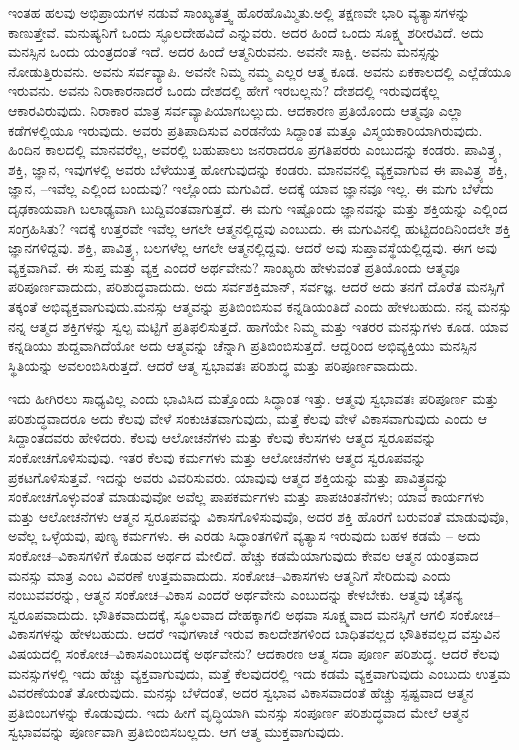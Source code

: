 \vskip 2pt

ಇಂತಹ ಹಲವು ಅಭಿಪ್ರಾಯಗಳ ನಡುವೆ ಸಾಂಖ್ಯತತ್ತ್ವ ಹೊರಹೊಮ್ಮಿತು.\break ಅಲ್ಲಿ ತಕ್ಷಣವೇ ಭಾರಿ ವ್ಯತ್ಯಾಸಗಳನ್ನು ಕಾಣುತ್ತೇವೆ. ಮನುಷ್ಯನಿಗೆ ಒಂದು ಸ್ಫೂಲದೇಹವಿದೆ ಎನ್ನುವರು. ಅದರ ಹಿಂದೆ ಒಂದು ಸೂಕ್ಷ್ಮ ಶರೀರವಿದೆ. ಅದು ಮನಸ್ಸಿನ ಒಂದು ಯಂತ್ರದಂತೆ ಇದೆ. ಅದರ ಹಿಂದೆ ಆತ್ಮನಿರುವನು. ಅವನೇ ಸಾಕ್ಷಿ. ಅವನು ಮನಸ್ಸನ್ನು ನೋಡುತ್ತಿರುವನು. ಅವನು ಸರ್ವವ್ಯಾಪಿ. ಅವನೇ ನಿಮ್ಮ ನಮ್ಮ ಎಲ್ಲರ ಆತ್ಮ ಕೂಡ. ಅವನು ಏಕಕಾಲದಲ್ಲಿ ಎಲ್ಲೆಡೆಯೂ ಇರುವನು. ಅವನು ನಿರಾಕಾರನಾದರೆ ಒಂದು ದೇಶದಲ್ಲಿ ಹೇಗೆ ಇರಬಲ್ಲನು? ದೇಶದಲ್ಲಿ ಇರುವುದಕ್ಕೆಲ್ಲ ಆಕಾರವಿರುವುದು. ನಿರಾಕಾರ ಮಾತ್ರ ಸರ್ವವ್ಯಾಪಿಯಾಗಬಲ್ಲುದು. ಆದಕಾರಣ ಪ್ರತಿಯೊಂದು ಆತ್ಮವೂ ಎಲ್ಲಾ ಕಡೆಗಳಲ್ಲಿಯೂ ಇರುವುದು. ಅವರು ಪ್ರತಿಪಾದಿಸುವ ಎರಡನೆಯ ಸಿದ್ದಾಂತ ಮತ್ತೂ ವಿಸ್ಮಯಕಾರಿಯಾಗಿರುವುದು. ಹಿಂದಿನ ಕಾಲದಲ್ಲಿ ಮಾನವರೆಲ್ಲ, ಅವರಲ್ಲಿ ಬಹುಪಾಲು ಜನರಾದರೂ ಪ್ರಗತಿಪರರು ಎಂಬುದನ್ನು ಕಂಡರು. ಪಾವಿತ್ರ್ಯ, ಶಕ್ತಿ, ಜ್ಞಾನ, ಇವುಗಳಲ್ಲಿ ಅವರು ಬೆಳೆಯುತ್ತ ಹೋಗುವುದನ್ನು ಕಂಡರು. ಮಾನವನಲ್ಲಿ ವ್ಯಕ್ತವಾಗುವ ಈ ಪಾವಿತ್ರ್ಯ ಶಕ್ತಿ, ಜ್ಞಾನ, –ಇವೆಲ್ಲ ಎಲ್ಲಿಂದ ಬಂದುವು? ಇಲ್ಲೊಂದು ಮಗುವಿದೆ. ಅದಕ್ಕೆ ಯಾವ ಜ್ಞಾನವೂ ಇಲ್ಲ. ಈ ಮಗು ಬೆಳೆದು ದೃಢಕಾಯವಾಗಿ ಬಲಾಢ್ಯವಾಗಿ ಬುದ್ದಿವಂತವಾಗುತ್ತದೆ. ಈ ಮಗು ಇಷ್ಟೊಂದು ಜ್ಞಾನವನ್ನು ಮತ್ತು ಶಕ್ತಿಯನ್ನು ಎಲ್ಲಿಂದ ಸಂಗ್ರಹಿಸಿತು? ಇದಕ್ಕೆ ಉತ್ತರವೇ ಇವೆಲ್ಲ ಆಗಲೇ ಆತ್ಮನಲ್ಲಿದ್ದವು ಎಂಬುದು. ಈ ಮಗುವಿನಲ್ಲಿ ಹುಟ್ಟಿದಂದಿನಿಂದಲೇ ಶಕ್ತಿ ಜ್ಞಾನಗಳಿದ್ದವು. ಶಕ್ತಿ, ಪಾವಿತ್ರ್ಯ, ಬಲಗಳೆಲ್ಲ ಆಗಲೇ ಆತ್ಮನಲ್ಲಿದ್ದವು. ಆದರೆ ಅವು ಸುಪ್ತಾವಸ್ಥೆಯಲ್ಲಿದ್ದವು. ಈಗ ಅವು ವ್ಯಕ್ತವಾಗಿವೆ. ಈ ಸುಪ್ತ ಮತ್ತು ವ್ಯಕ್ತ ಎಂದರೆ ಅರ್ಥವೇನು? ಸಾಂಖ್ಯರು ಹೇಳುವಂತೆ ಪ್ರತಿಯೊಂದು ಆತ್ಮವೂ ಪರಿಪೂರ್ಣವಾದುದು, ಪರಿಶುದ್ಧವಾದುದು. ಅದು ಸರ್ವಶಕ್ತಿಮಾನ್, ಸರ್ವಜ್ಞ. ಆದರೆ ಅದು ತನಗೆ ದೊರೆತ ಮನಸ್ಸಿಗೆ ತಕ್ಕಂತೆ ಅಭಿವ್ಯಕ್ತವಾಗುವುದು.\break ಮನಸ್ಸು ಆತ್ಮವನ್ನು ಪ್ರತಿಬಿಂಬಿಸುವ ಕನ್ನಡಿಯಂತಿದೆ ಎಂದು ಹೇಳಬಹುದು. ನನ್ನ ಮನಸ್ಸು ನನ್ನ ಆತ್ಮದ ಶಕ್ತಿಗಳನ್ನು ಸ್ವಲ್ಪ ಮಟ್ಟಿಗೆ ಪ್ರತಿಫಲಿಸುತ್ತದೆ. ಹಾಗೆಯೇ ನಿಮ್ಮ ಮತ್ತು ಇತರರ ಮನಸ್ಸುಗಳು ಕೂಡ. ಯಾವ ಕನ್ನಡಿಯು ಶುದ್ದವಾಗಿದೆಯೋ ಅದು ಆತ್ಮವನ್ನು ಚೆನ್ನಾಗಿ ಪ್ರತಿಬಿಂಬಿಸುತ್ತದೆ. ಆದ್ದರಿಂದ ಅಭಿವ್ಯಕ್ತಿಯು ಮನಸ್ಸಿನ ಸ್ಥಿತಿಯನ್ನು ಅವಲಂಬಿಸಿರುತ್ತದೆ. ಆದರೆ ಆತ್ಮ ಸ್ವಭಾವತಃ ಪರಿಶುದ್ಧ ಮತ್ತು ಪರಿಪೂರ್ಣವಾದುದು.

ಇದು ಹೀಗಿರಲು ಸಾಧ್ಯವಿಲ್ಲ ಎಂದು ಭಾವಿಸಿದ ಮತ್ತೊಂದು ಸಿದ್ಧಾಂತ ಇತ್ತು. ಆತ್ಮವು ಸ್ವಭಾವತಃ ಪರಿಪೂರ್ಣ ಮತ್ತು ಪರಿಶುದ್ಧವಾದರೂ ಅದು ಕೆಲವು ವೇಳೆ ಸಂಕುಚಿತವಾಗುವುದು, ಮತ್ತೆ ಕೆಲವು ವೇಳೆ ವಿಕಾಸವಾಗುವುದು ಎಂದು ಆ ಸಿದ್ದಾಂತದವರು ಹೇಳಿದರು. ಕೆಲವು ಆಲೋಚನೆಗಳು ಮತ್ತು ಕೆಲವು ಕೆಲಸಗಳು ಆತ್ಮದ ಸ್ವರೂಪವನ್ನು ಸಂಕೋಚಗೊಳಿಸುವುವು. ಇತರ ಕೆಲವು ಕರ್ಮಗಳು ಮತ್ತು ಆಲೋಚನೆಗಳು ಆತ್ಮದ ಸ್ವರೂಪವನ್ನು ಪ್ರಕಟಗೊಳಿಸುತ್ತವೆ. ಇದನ್ನು ಅವರು ವಿವರಿಸುವರು. ಯಾವುವು ಆತ್ಮದ ಶಕ್ತಿಯನ್ನು ಮತ್ತು ಪಾವಿತ್ರ್ಯವನ್ನು ಸಂಕೋಚಗೊಳ್ಳುವಂತೆ ಮಾಡುವುವೋ ಅವೆಲ್ಲ ಪಾಪಕರ್ಮಗಳು ಮತ್ತು ಪಾಪಚಿಂತನೆಗಳು; ಯಾವ ಕಾರ್ಯಗಳು ಮತ್ತು ಆಲೋಚನೆಗಳು ಆತ್ಮನ ಸ್ವರೂಪವನ್ನು ವಿಕಾಸಗೊಳಿಸುವುವೊ, ಅದರ ಶಕ್ತಿ ಹೊರಗೆ ಬರುವಂತೆ ಮಾಡುವುವೊ, ಅವೆಲ್ಲ ಒಳ್ಳೆಯವು, ಪುಣ್ಯ ಕರ್ಮಗಳು. ಈ ಎರಡು ಸಿದ್ಧಾಂತಗಳಿಗೆ ವ್ಯತ್ಯಾಸ ಇರುವುದು ಬಹಳ ಕಡಮೆ – ಅದು ಸಂಕೋಚ–ವಿಕಾಸಗಳಿಗೆ ಕೊಡುವ ಅರ್ಥದ ಮೇಲಿದೆ. ಹೆಚ್ಚು ಕಡಮೆಯಾಗುವುದು ಕೇವಲ ಆತ್ಮನ ಯಂತ್ರವಾದ ಮನಸ್ಸು ಮಾತ್ರ ಎಂಬ ವಿವರಣೆ ಉತ್ತಮವಾದುದು. ಸಂಕೋಚ–ವಿಕಾಸಗಳು ಆತ್ಮನಿಗೆ ಸೇರಿದುವು ಎಂದು ನಂಬುವವರನ್ನು, ಆತ್ಮನ ಸಂಕೋಚ–ವಿಕಾಸ ಎಂದರೆ ಅರ್ಥವೇನು ಎಂಬುದನ್ನು ಕೇಳಬೇಕು. ಆತ್ಮವು ಚೈತನ್ಯ ಸ್ವರೂಪವಾದುದು. ಭೌತಿಕವಾದುದಕ್ಕೆ, ಸ್ಥೂಲವಾದ ದೇಹಕ್ಕಾಗಲಿ ಅಥವಾ ಸೂಕ್ಷ್ಮವಾದ ಮನಸ್ಸಿಗೆ ಆಗಲಿ ಸಂಕೋಚ–ವಿಕಾಸಗಳನ್ನು ಹೇಳಬಹುದು. ಆದರೆ ಇವುಗಳಾಚೆ ಇರುವ ಕಾಲದೇಶಗಳಿಂದ ಬಾಧಿತವಲ್ಲದ ಭೌತಿಕವಲ್ಲದ ವಸ್ತುವಿನ ವಿಷಯದಲ್ಲಿ ಸಂಕೋಚ–ವಿಕಾಸ\break ಎಂಬುದಕ್ಕೆ ಅರ್ಥವೇನು? ಆದಕಾರಣ ಆತ್ಮ ಸದಾ ಪೂರ್ಣ ಪರಿಶುದ್ಧ. ಆದರೆ ಕೆಲವು ಮನಸ್ಸುಗಳಲ್ಲಿ ಇದು ಹೆಚ್ಚು ವ್ಯಕ್ತವಾಗುವುದು, ಮತ್ತೆ ಕೆಲವುದರಲ್ಲಿ ಇದು ಕಡಮೆ ವ್ಯಕ್ತವಾಗುವುದು ಎಂಬುದು ಉತ್ತಮ ವಿವರಣೆಯಂತೆ ತೋರುವುದು. ಮನಸ್ಸು ಬೆಳೆದಂತೆ, ಅದರ ಸ್ವಭಾವ ವಿಕಾಸವಾದಂತೆ ಹೆಚ್ಚು ಸ್ಪಷ್ಟವಾದ ಆತ್ಮನ ಪ್ರತಿಬಿಂಬಗಳನ್ನು ಕೊಡುವುದು. ಇದು ಹೀಗೆ ವೃದ್ಧಿಯಾಗಿ ಮನಸ್ಸು ಸಂಪೂರ್ಣ ಪರಿಶುದ್ಧವಾದ ಮೇಲೆ ಆತ್ಮನ ಸ್ವಭಾವವನ್ನು ಪೂರ್ಣವಾಗಿ ಪ್ರತಿಬಿಂಬಿಸಬಲ್ಲದು. ಆಗ ಆತ್ಮ ಮುಕ್ತವಾಗುವುದು.

